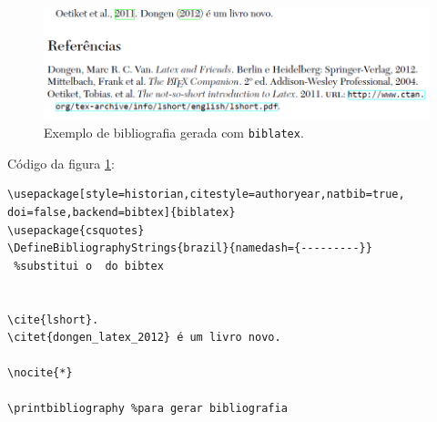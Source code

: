 \begin{figure}
\centering
\includegraphics[width=0.7\linewidth]{./biblatex-figura}
\caption{Exemplo de bibliografia gerada com \texttt{biblatex}.}
\label{fig:biblatex-figura}
\end{figure}

Código da figura \ref{fig:biblatex-figura}:

\begin{verbatim}
\usepackage[style=historian,citestyle=authoryear,natbib=true,
doi=false,backend=bibtex]{biblatex}
\usepackage{csquotes}
\DefineBibliographyStrings{brazil}{namedash={---------}}
 %substitui o  do bibtex


\cite{lshort}.
\citet{dongen_latex_2012} é um livro novo.

\nocite{*}

\printbibliography %para gerar bibliografia



\end{verbatim}

